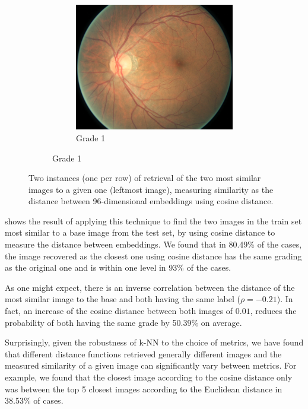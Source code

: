 \begin{figure}[tb]
\begin{subfigure}[b]{\textwidth}
        \hfill
        \begin{subfigure}[b]{0.32\textwidth}
            \centering
            \includegraphics[width=\textwidth, height=0.2\textheight]{figures/chapter6/similar/1669_right.jpeg}
            \caption{Grade 1}
         \end{subfigure}
    \end{subfigure}

    \caption{Two instances (one per row) of retrieval of the two most similar images to a given one (leftmost image), measuring similarity as the distance between 96-dimensional embeddings using cosine distance.}
    \label{fig:semantic_search}
    \centering
\end{figure}

 shows the result of applying this technique to find the two images in the train set most similar to a base image from the test set, by using cosine distance to measure the distance between embeddings. We found that in 80.49\% of the cases, the image recovered as the closest one using cosine distance has the same grading as the original one and is within one level in 93\% of the cases.

As one might expect, there is an inverse correlation between the distance of the most similar image to the base and both having the same label ($\rho = -0.21$). In fact, an increase of the cosine distance between both images of \( 0.01 \), reduces the probability of both having the same grade by 50.39\% on average. 

Surprisingly, given the robustness of k-NN to the choice of metrics, we have found that different distance functions retrieved generally different images and the measured similarity of a given image can significantly vary between metrics. For example, we found that the closest image according to the cosine distance only was between the top 5 closest images according to the Euclidean distance in 38.53\% of cases. 

